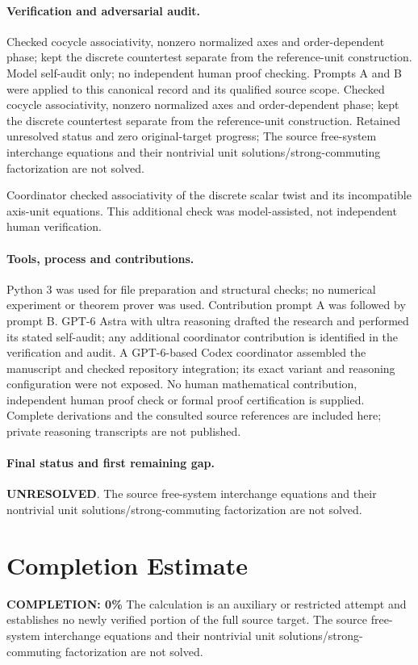 \documentclass[11pt]{article}
\begin{document}
\paragraph{Verification and adversarial audit.}
Checked cocycle associativity, nonzero normalized axes and order-dependent phase; kept the discrete countertest separate from the reference-unit construction. Model self-audit only; no independent human proof checking. Prompts A and B were applied to this canonical record and its qualified source scope. Checked cocycle associativity, nonzero normalized axes and order-dependent phase; kept the discrete countertest separate from the reference-unit construction. Retained unresolved status and zero original-target progress; The source free-system interchange equations and their nontrivial unit solutions/strong-commuting factorization are not solved.

Coordinator checked associativity of the discrete scalar twist and its incompatible axis-unit equations. This additional check was model-assisted, not independent human verification.

\paragraph{Tools, process and contributions.}
Python 3 was used for file preparation and structural checks; no numerical experiment or theorem prover was used. Contribution prompt A was followed by prompt B. GPT-6 Astra with ultra reasoning drafted the research and performed its stated self-audit; any additional coordinator contribution is identified in the verification and audit. A GPT-6-based Codex coordinator assembled the manuscript and checked repository integration; its exact variant and reasoning configuration were not exposed. No human mathematical contribution, independent human proof check or formal proof certification is supplied. Complete derivations and the consulted source references are included here; private reasoning transcripts are not published.

\paragraph{Final status and first remaining gap.}
\textbf{UNRESOLVED}. The source free-system interchange equations and their nontrivial unit solutions/strong-commuting factorization are not solved.

\section{Completion Estimate}
\noindent\textbf{COMPLETION: 0\%}
The calculation is an auxiliary or restricted attempt and establishes no newly verified portion of the full source target. The source free-system interchange equations and their nontrivial unit solutions/strong-commuting factorization are not solved.
\end{document}

